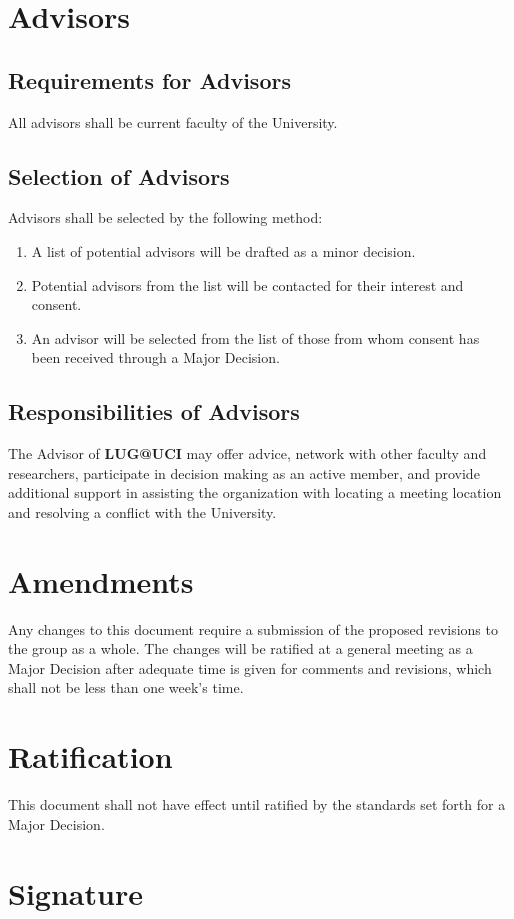 \documentclass{article}
\begin{document}
\section{Advisors}

\subsection{Requirements for Advisors}

All advisors shall be current faculty of the University.

\subsection{Selection of Advisors}

Advisors shall be selected by the following method:

\begin{enumerate}
\item A list of potential advisors will be drafted as a minor decision.
\item Potential advisors from the list will be contacted for their
    interest and consent.
\item An advisor will be selected from the list of those from whom
    consent has been received through a Major Decision.
\end{enumerate}

\subsection{Responsibilities of Advisors}

The Advisor of \textbf{LUG@UCI} may offer advice, network with other faculty and
researchers, participate in decision making as an active member, and provide
additional support in assisting the organization with locating a meeting location
and resolving a conflict with the University.

\section{Amendments}

Any changes to this document require a submission of the proposed revisions to the
group as a whole. The changes will be ratified at a general meeting as a Major Decision
after adequate time is given for comments and revisions, which shall not be less than one
week's time.

\section{Ratification}

This document shall not have effect until ratified by the standards set forth for
a Major Decision.

\section{Signature}
\end{document}
